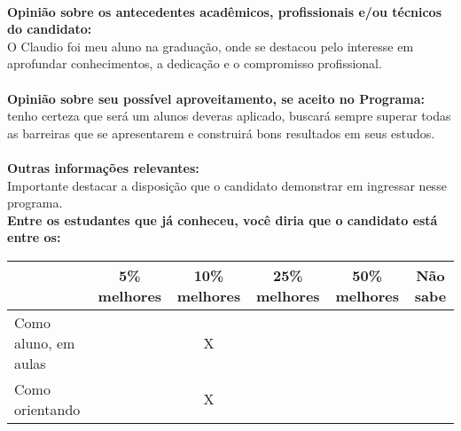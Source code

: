 \documentclass[11pt]{article}
\begin{document}
\\
\textbf{Opinião sobre os antecedentes acadêmicos, profissionais e/ou técnicos do candidato:}
\\O Claudio foi meu aluno na graduação, onde se destacou pelo interesse em aprofundar conhecimentos, a dedicação e o compromisso profissional.\\
\\
\textbf{Opinião sobre seu possível aproveitamento, se aceito no Programa:}
\\tenho certeza que será um alunos deveras aplicado, buscará sempre superar todas as barreiras que se apresentarem e construirá bons resultados em seus estudos.\\ 
\\
\textbf{Outras informações relevantes:} \\Importante destacar a disposição que o candidato demonstrar em ingressar nesse programa.
\\[0.3cm]
\textbf{Entre os estudantes que já conheceu, você diria que o candidato está entre os:}
\\
\begin{tabular}{|l|c|c|c|c|c|}
\hline
 & 5\% melhores & 10\% melhores & 25\% melhores & 50\% melhores & Não sabe \\
\hline
Como aluno, em aulas &  & X &  &  & \\
\hline
Como orientando &  & X &  &  & \\
\hline
\end{tabular}
\end{document}
